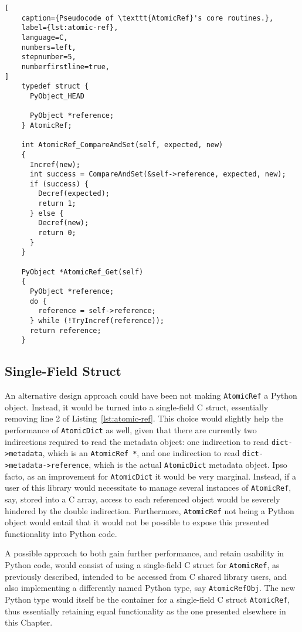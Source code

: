 \begin{lstlisting}[
	caption={Pseudocode of \texttt{AtomicRef}'s core routines.},
    label={lst:atomic-ref},
    language=C,
    numbers=left,
	stepnumber=5,
	numberfirstline=true,
]
    typedef struct {
      PyObject_HEAD

      PyObject *reference;
    } AtomicRef;

    int AtomicRef_CompareAndSet(self, expected, new)
    {
      Incref(new);
      int success = CompareAndSet(&self->reference, expected, new);
      if (success) {
        Decref(expected);
        return 1;
      } else {
        Decref(new);
        return 0;
      }
    }

    PyObject *AtomicRef_Get(self)
    {
      PyObject *reference;
      do {
        reference = self->reference;
      } while (!TryIncref(reference));
      return reference;
    }
\end{lstlisting}


\subsection{Single-Field Struct}\label{subsec:single-field-struct}

An alternative design approach could have been not making \texttt{AtomicRef} a Python object.
Instead, it would be turned into a single-field C struct, essentially removing line 2 of Listing~\ref{lst:atomic-ref}.
This choice would slightly help the performance of \texttt{AtomicDict} as well, given that there are currently two indirections required to read the metadata object: one indirection to read \texttt{{dict->metadata}}, which is an \texttt{AtomicRef *}, and one indirection to read \texttt{{dict->metadata->reference}}, which is the actual \texttt{AtomicDict} metadata object.
Ipso facto, as an improvement for \texttt{AtomicDict} it would be very marginal.
Instead, if a user of this library would necessitate to manage several instances of \texttt{AtomicRef}, say, stored into a C array, access to each referenced object would be severely hindered by the double indirection.
Furthermore, \texttt{AtomicRef} not being a Python object would entail that it would not be possible to expose this presented functionality into Python code.

A possible approach to both gain further performance, and retain usability in Python code, would consist of using a single-field C struct for \texttt{AtomicRef}, as previously described, intended to be accessed from C shared library users, and also implementing a differently named Python type, say \texttt{AtomicRefObj}.
The new Python type would itself be the container for a single-field C struct \texttt{AtomicRef}, thus essentially retaining equal functionality as the one presented elsewhere in this Chapter.

